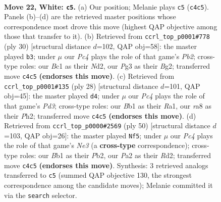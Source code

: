 \documentclass[11pt]{article}
\begin{document}
\clearpage

\begin{figure}[p]\centering
\begin{subfigure}{0.46\textwidth}\centering
\resizebox{\linewidth}{!}{%
\newchessgame
\chessboard[
  setfen={r1br4/ppp2pk1/3p4/4b1qp/N1P1Pn2/4Q1Pp/PP3P2/RBB1R1K1 w - - 1 22},
  showmover=false,
  pgfstyle=straightmove, color=movearrow, markmove={c4-c5}
]}
\caption{}
\end{subfigure}\hfill
\begin{subfigure}{0.46\textwidth}\centering
\resizebox{\linewidth}{!}{%
\newchessgame
\chessboard[
  setfen={1k1r1b1r/1ppq1ppp/4p3/3nP2b/p2Q4/2P3PP/PP1N1PB1/R1B2RK1 w - - 2 16},
  showmover=false,
  pgfstyle=straightmove, color=movearrow, markmove={b2-b3}
]}
\caption{}
\end{subfigure}
\\[4pt]
\begin{subfigure}{0.46\textwidth}\centering
\resizebox{\linewidth}{!}{%
\newchessgame
\chessboard[
  setfen={r1b1k2r/1pqp1ppp/4p3/1pb1n3/4PQ2/2NP2P1/PP3P1P/R1BR2K1 w kq - 0 15},
  showmover=false,
  pgfstyle=straightmove, color=movearrow, markmove={d3-d4}
]}
\caption{}
\end{subfigure}\hfill
\begin{subfigure}{0.46\textwidth}\centering
\resizebox{\linewidth}{!}{%
\newchessgame
\chessboard[
  setfen={rq4k1/1b2rppp/pB1p1n2/1p2b3/4P2Q/P1P1NB2/1P1R2PP/5R1K w - - 4 26},
  showmover=false,
  pgfstyle=straightmove, color=movearrow, markmove={e3-f5}
]}
\caption{}
\end{subfigure}
\caption{\textbf{Move 22, White: \texttt{c5}.} (a) Our position; Melanie plays \texttt{c5} (\texttt{c4c5}). Panels (b)--(d) are the retrieved master positions whose correspondence most drove this move (highest QAP objective among those that transfer to it). (b) Retrieved from \texttt{ccrl\_top\_p0001\#778} (ply 30) [structural distance $d$=102, QAP obj=58]: the master played \texttt{b3}; under $\mu$ our \emph{Pc4} plays the role of that game's \emph{Pb2}; cross-type roles: our \emph{B}c1 as their \emph{N}d2, our \emph{P}g3 as their \emph{B}g2; transferred move \texttt{c4c5} \textbf{(endorses this move)}. (c) Retrieved from \texttt{ccrl\_top\_p0001\#135} (ply 28) [structural distance $d$=101, QAP obj=45]: the master played \texttt{d4}; under $\mu$ our \emph{Pc4} plays the role of that game's \emph{Pd3}; cross-type roles: our \emph{B}b1 as their \emph{R}a1, our \emph{r}a8 as their \emph{P}h2; transferred move \texttt{c4c5} \textbf{(endorses this move)}. (d) Retrieved from \texttt{ccrl\_top\_p0000\#2569} (ply 50) [structural distance $d$=103, QAP obj=26]: the master played \texttt{Nf5}; under $\mu$ our \emph{Pc4} plays the role of that game's \emph{Ne3} (a \textbf{cross-type} correspondence); cross-type roles: our \emph{B}b1 as their \emph{P}b2, our \emph{P}a2 as their \emph{R}d2; transferred move \texttt{c4c5} \textbf{(endorses this move)}. Synthesis: 3 retrieved analogs transferred to \texttt{c5} (summed QAP objective 130, the strongest correspondence among the candidate moves); Melanie committed it via the \texttt{search} selector.}
\label{fig:thought-m42}
\end{figure}
\end{document}
